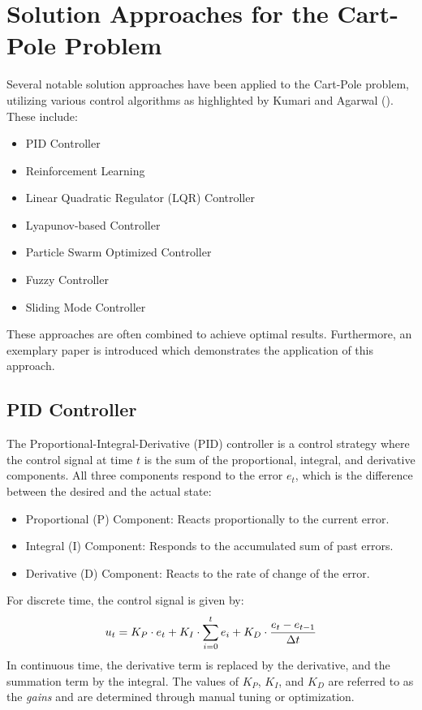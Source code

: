 \section{Solution Approaches for the Cart-Pole Problem}

Several notable solution approaches have been applied to the Cart-Pole problem, utilizing various control algorithms as highlighted by Kumari and Agarwal (\citeyear{kumari_root_2023}). These include:
\begin{itemize}
    \item PID Controller
    \item Reinforcement Learning
    \item Linear Quadratic Regulator (LQR) Controller
    \item Lyapunov-based Controller
    \item Particle Swarm Optimized Controller
    \item Fuzzy Controller
    \item Sliding Mode Controller
\end{itemize}

These approaches are often combined to achieve optimal results. Furthermore, an exemplary paper is introduced which demonstrates the application of this approach.

\subsection{PID Controller}

The Proportional-Integral-Derivative (PID) controller is a control strategy where the control signal at time $t$ is the sum of the proportional, integral, and derivative components. All three components respond to the error $e_t$, which is the difference between the desired and the actual state:
\begin{itemize}
    \item Proportional (P) Component: Reacts proportionally to the current error.
    \item Integral (I) Component: Responds to the accumulated sum of past errors.
    \item Derivative (D) Component: Reacts to the rate of change of the error.
\end{itemize}
For discrete time, the control signal is given by:
\begin{align}
    u_t = K_P\cdot e_t + K_I\cdot\sum_{i=0}^t e_i + K_D\cdot\frac{e_t - e_{t-1}}{\Delta t} \notag
\end{align}
In continuous time, the derivative term is replaced by the derivative, and the summation term by the integral. The values of $K_P$, $K_I$, and $K_D$ are referred to as the \textit{gains} and are determined through manual tuning or optimization.

